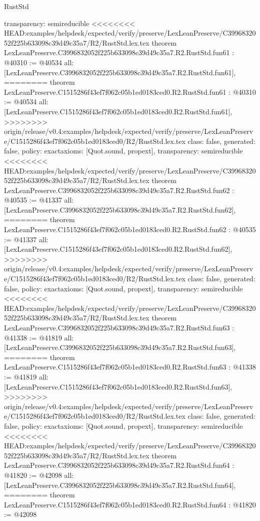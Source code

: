 \begin{lexlean}{RustStd}
\begin{coremodule}
{\begin{coremodule}
{{{{{{{{{{{{{{{{{{{{{{{{{{{{{{{{{{{{{{{{{{{{{{{{{{{{{{{{{{{{{{{{  transparency: semireducible
}
<<<<<<<< HEAD:examples/helpdesk/expected/verify/preserve/LexLeanPreserve/C3996832052f225b633098c39d49c35a7/R2/RustStd.lex.tex
theorem LexLeanPreserve.C3996832052f225b633098c39d49c35a7.R2.RustStd.fun61 : @40310 := @40534 {
  all: [LexLeanPreserve.C3996832052f225b633098c39d49c35a7.R2.RustStd.fun61],
========
theorem LexLeanPreserve.C1515286f43ef7f062c05b1ed0183ced0.R2.RustStd.fun61 : @40310 := @40534 {
  all: [LexLeanPreserve.C1515286f43ef7f062c05b1ed0183ced0.R2.RustStd.fun61],
>>>>>>>> origin/release/v0.4:examples/helpdesk/expected/verify/preserve/LexLeanPreserve/C1515286f43ef7f062c05b1ed0183ced0/R2/RustStd.lex.tex
  class: false,
  generated: false,
  policy: exact{axioms: [Quot.sound, propext]},
  transparency: semireducible
}
<<<<<<<< HEAD:examples/helpdesk/expected/verify/preserve/LexLeanPreserve/C3996832052f225b633098c39d49c35a7/R2/RustStd.lex.tex
theorem LexLeanPreserve.C3996832052f225b633098c39d49c35a7.R2.RustStd.fun62 : @40535 := @41337 {
  all: [LexLeanPreserve.C3996832052f225b633098c39d49c35a7.R2.RustStd.fun62],
========
theorem LexLeanPreserve.C1515286f43ef7f062c05b1ed0183ced0.R2.RustStd.fun62 : @40535 := @41337 {
  all: [LexLeanPreserve.C1515286f43ef7f062c05b1ed0183ced0.R2.RustStd.fun62],
>>>>>>>> origin/release/v0.4:examples/helpdesk/expected/verify/preserve/LexLeanPreserve/C1515286f43ef7f062c05b1ed0183ced0/R2/RustStd.lex.tex
  class: false,
  generated: false,
  policy: exact{axioms: [Quot.sound, propext]},
  transparency: semireducible
}
<<<<<<<< HEAD:examples/helpdesk/expected/verify/preserve/LexLeanPreserve/C3996832052f225b633098c39d49c35a7/R2/RustStd.lex.tex
theorem LexLeanPreserve.C3996832052f225b633098c39d49c35a7.R2.RustStd.fun63 : @41338 := @41819 {
  all: [LexLeanPreserve.C3996832052f225b633098c39d49c35a7.R2.RustStd.fun63],
========
theorem LexLeanPreserve.C1515286f43ef7f062c05b1ed0183ced0.R2.RustStd.fun63 : @41338 := @41819 {
  all: [LexLeanPreserve.C1515286f43ef7f062c05b1ed0183ced0.R2.RustStd.fun63],
>>>>>>>> origin/release/v0.4:examples/helpdesk/expected/verify/preserve/LexLeanPreserve/C1515286f43ef7f062c05b1ed0183ced0/R2/RustStd.lex.tex
  class: false,
  generated: false,
  policy: exact{axioms: [Quot.sound, propext]},
  transparency: semireducible
}
<<<<<<<< HEAD:examples/helpdesk/expected/verify/preserve/LexLeanPreserve/C3996832052f225b633098c39d49c35a7/R2/RustStd.lex.tex
theorem LexLeanPreserve.C3996832052f225b633098c39d49c35a7.R2.RustStd.fun64 : @41820 := @42098 {
  all: [LexLeanPreserve.C3996832052f225b633098c39d49c35a7.R2.RustStd.fun64],
========
theorem LexLeanPreserve.C1515286f43ef7f062c05b1ed0183ced0.R2.RustStd.fun64 : @41820 := @42098 {
}}}}}}}}}}}}}}}}}}}}}}}}}}}}}}}}}}}}}}}}}}}}}}}}}}}}}}}}}}}}}}}}}}}}
\end{coremodule}}
\end{coremodule}
\end{lexlean}
